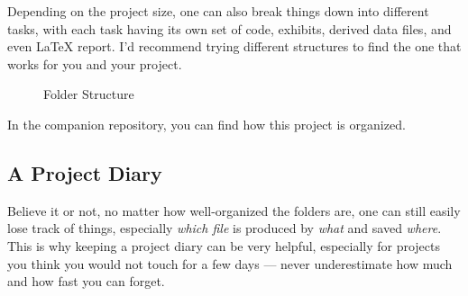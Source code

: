 Depending on the project size, one can also break things down into different tasks, with each task having its own set of code, exhibits, derived data files, and even {\LaTeX} report. I'd recommend trying different structures to find the one that works for you and your project. 

\begin{figure}[H]
    \centering
    \caption{Folder Structure}
    
\end{figure}

In the companion repository, you can find how this project is organized. 

\subsection{A Project Diary}
Believe it or not, no matter how well-organized the folders are, one can still easily lose track of things, especially \textit{which file} is produced by \textit{what} and saved \textit{where}. This is why keeping a project diary can be very helpful, especially for projects you think you would not touch for a few days --- never underestimate how much and how fast you can forget.  


